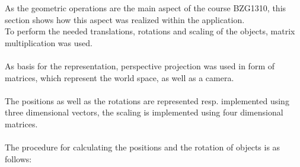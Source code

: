 \documentclass[pdftex,12pt,a4paper]{article}
\begin{document}
As the geometric operations are the main aspect of the course BZG1310, this section shows how this aspect was realized within the application.\\
To perform the needed translations, rotations and scaling of the objects, matrix multiplication was used.\\
\\
As basis for the representation, perspective projection was used in form of matrices, which represent the world space, as well as a camera.\\
\\
The positions as well as the rotations are represented resp. implemented using three dimensional vectors, the scaling is implemented using four dimensional matrices.\\
\\
The procedure for calculating the positions and the rotation of objects is as follows:
\end{document}
